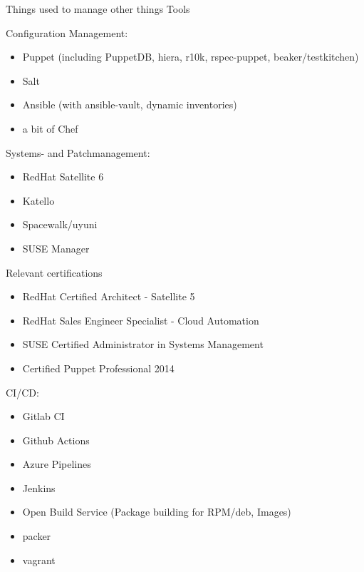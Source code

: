 \begin{cventries}
{    }
  \cventry
    {Things used to manage other things}
    {Tools}
    {}
    {}
    {
      \begin{cvitems}
        \item Configuration Management:
          \begin{itemize}
            \item Puppet (including PuppetDB, hiera, r10k, rspec-puppet, beaker/testkitchen)
            \item Salt
            \item Ansible (with ansible-vault, dynamic inventories)
            \item a bit of Chef
          \end{itemize}
        \item Systems- and Patchmanagement:
        \begin{itemize}
          \item RedHat Satellite 6
          \item Katello
          \item Spacewalk/uyuni
          \item SUSE Manager
        \end{itemize}
        \item Relevant certifications
          \begin{itemize}
            \item RedHat Certified Architect - Satellite 5
            \item RedHat Sales Engineer Specialist - Cloud Automation
            \item SUSE Certified Administrator in Systems Management
            \item Certified Puppet Professional 2014
          \end{itemize}
      \item CI/CD:
        \begin{itemize}
          \item Gitlab CI
          \item Github Actions
          \item Azure Pipelines
          \item Jenkins
          \item Open Build Service (Package building for RPM/deb, Images)
          \item packer
          \item vagrant
        \end{itemize}
      \end{cvitems}
    }


\end{cventries}
